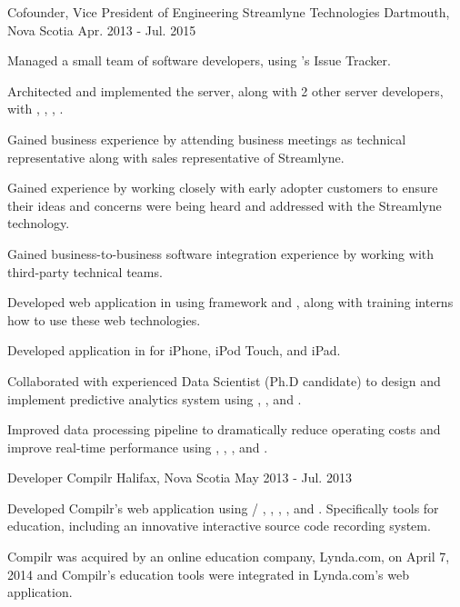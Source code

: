 \begin{cventries}
  \cventry
    {Cofounder, Vice President of Engineering} %
    {Streamlyne Technologies}  %
    {Dartmouth, Nova Scotia} %
    {Apr. 2013 - Jul. 2015} %
    {
      \begin{cvitems} %
	\item {Managed a small team of software developers, using 's Issue Tracker.}
	\item {Architected and implemented the  server, along with 2 other server developers, with , , , .}
	\item {Gained business  experience by attending business meetings as technical representative along with sales representative of Streamlyne.}
	\item {Gained  experience by working closely with early adopter customers to ensure their ideas and concerns were being heard and addressed with the Streamlyne technology.}
	\item {Gained business-to-business software integration experience by working with third-party technical teams.}
	\item {Developed web application in  using  framework and , along with training interns how to use these web technologies.}
	\item {Developed  application in  for iPhone, iPod Touch, and iPad.}
	\item {Collaborated with experienced Data Scientist (Ph.D candidate) to design and implement predictive analytics system using , , and .}
	\item {Improved data processing pipeline to dramatically reduce operating costs and improve real-time performance using , , , and .}
      \end{cvitems} 
    }

  \cventry
    {Developer} %
    {Compilr} %
    {Halifax, Nova Scotia} %
    {May 2013 - Jul. 2013} %
    {
      \begin{cvitems} %
	\item {Developed Compilr's web application using  / , , , , and . Specifically tools for education, including an innovative interactive source code recording system.}
	\item {Compilr was acquired by an online education company, Lynda.com, on April 7, 2014 and Compilr's education tools were integrated in Lynda.com's web application.}
      \end{cvitems}
    }

\end{cventries}

